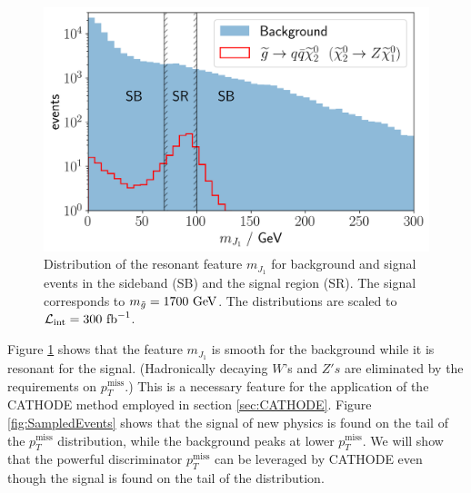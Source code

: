 \documentclass[prd, twocolumn, superscriptaddress,floatfix, nofootinbib, preprintnumbers]{revtex4-2}
\begin{document}
\begin{figure}[t]
\centering
\includegraphics[width=\linewidth]{Mj1_woSR.png}
\caption{Distribution of the resonant feature $m_{J_1}$ for background and signal events in the sideband (SB) and the signal region (SR). The signal corresponds to $m_{\tilde{g}}=1700~{\rm GeV}$. The distributions are scaled to $\mathcal{L}_\text{int}=300~{\rm fb}^{-1}$. }
\label{fig:mj_distribution}
\end{figure}

Figure \ref{fig:mj_distribution} shows that the feature $m_{J_1}$ is smooth for the background while it is resonant for the signal. (Hadronically decaying $W$'s and $Z's$ are eliminated by the requirements on $p_T^\text{miss}$.) This is a necessary feature for the application of the CATHODE method employed in section \ref{sec:CATHODE}. 
Figure \ref{fig:SampledEvents} shows that the signal of new physics is found on the tail of the $p_T^\text{miss}$ distribution, while the background peaks at lower $p_T^\text{miss}$. We will show that the powerful discriminator $p_T^\text{miss}$ can be leveraged by CATHODE even though the signal is found on the tail of the distribution.
\end{document}
